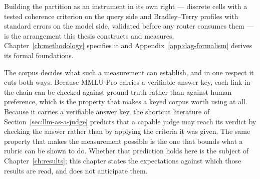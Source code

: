 Building the partition as an instrument in its own right --- discrete
cells with a tested coherence criterion on the query side and
Bradley--Terry profiles with standard errors on the model side,
validated before any router consumes them --- is the arrangement this
thesis constructs and measures. Chapter~\ref{ch:methodology}
specifies it and Appendix~\ref{app:dag-formalism} derives its formal
foundations.

The corpus decides what such a measurement can establish, and in one
respect it cuts both ways. Because MMLU-Pro carries a verifiable
answer key, each link in the chain can be checked against ground
truth rather than against human preference, which is the property
that makes a keyed corpus worth using at all. Because it carries a
verifiable answer key, the shortcut literature of
Section~\ref{sec:llm-as-a-judge} predicts that a capable judge may
reach its verdict by checking the answer rather than by applying the
criteria it was given. The same property that makes the measurement
possible is the one that bounds what a rubric can be shown to do.
Whether that prediction holds here is the subject of
Chapter~\ref{ch:results}; this chapter states the expectations
against which those results are read, and does not anticipate them.
